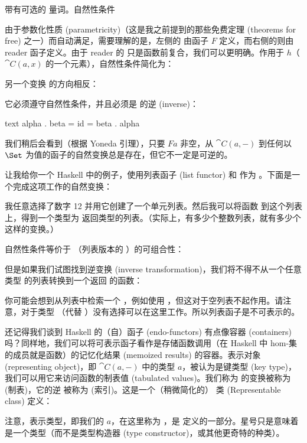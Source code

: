 带有可选的  量词。自然性条件

由于参数化性质 (parametricity)（这是我之前提到的那些免费定理 (theorems for free) 之一）而自动满足，需要理解的是，左侧的  由函子 $F$ 定义，而右侧的则由 reader 函子定义。由于 reader 的  只是函数前复合，我们可以更明确。作用于 $h$（$\cat{C}(a, x)$ 的一个元素），自然性条件简化为：

另一个变换  的方向相反：

它必须遵守自然性条件，并且必须是  的逆 (inverse)：

\begin{snip}{text}
alpha . beta = id = beta . alpha
\end{snip}
我们稍后会看到（根据 Yoneda 引理），只要 $F a$ 非空，从 $\cat{C}(a, -)$ 到任何以 $\Set$ 为值的函子的自然变换总是存在，但它不一定是可逆的。

让我给你一个 Haskell 中的例子，使用列表函子 (list functor) 和  作为 。下面是一个完成这项工作的自然变换：

我任意选择了数字 12 并用它创建了一个单元列表。然后我可以将函数   到这个列表上，得到一个类型为  返回类型的列表。（实际上，有多少个整数列表，就有多少个这样的变换。）

自然性条件等价于 （列表版本的 ）的可组合性：

但是如果我们试图找到逆变换 (inverse transformation)，我们将不得不从一个任意类型  的列表转换到一个返回  的函数：

你可能会想到从列表中检索一个 ，例如使用 ，但这对于空列表不起作用。请注意，对于类型 （代替 ）没有选择可以在这里工作。所以列表函子是不可表示的。

还记得我们谈到 Haskell 的（自）函子 (endo-functors) 有点像容器 (containers) 吗？同样地，我们可以将可表示函子看作是存储函数调用（在 Haskell 中 hom-集的成员就是函数）的记忆化结果 (memoized results) 的容器。表示对象 (representing object)，即 $\cat{C}(a, -)$ 中的类型 $a$，被认为是键类型 (key type)，我们可以用它来访问函数的制表值 (tabulated values)。我们称为  的变换被称为  (制表)，它的逆  被称为  (索引)。这是一个（稍微简化的） 类 (Representable class) 定义：

注意，表示类型，即我们的 $a$，在这里称为 ，是  定义的一部分。星号只是意味着  是一个类型（而不是类型构造器 (type constructor)，或其他更奇特的种类）。

